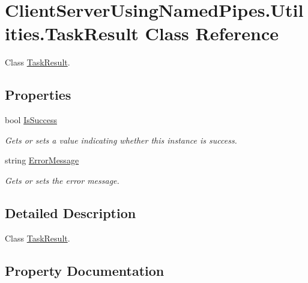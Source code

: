 \hypertarget{class_client_server_using_named_pipes_1_1_utilities_1_1_task_result}{}\section{Client\+Server\+Using\+Named\+Pipes.\+Utilities.\+Task\+Result Class Reference}
\label{class_client_server_using_named_pipes_1_1_utilities_1_1_task_result}


Class \hyperlink{class_client_server_using_named_pipes_1_1_utilities_1_1_task_result}{Task\+Result}.  


\subsection*{Properties}
\begin{DoxyCompactItemize}
\item 
bool \hyperlink{class_client_server_using_named_pipes_1_1_utilities_1_1_task_result_a3c996932ff1f7e1754af3f0b34f6669e}{Is\+Success}
\begin{DoxyCompactList}\small\item\em Gets or sets a value indicating whether this instance is success. \end{DoxyCompactList}\item 
string \hyperlink{class_client_server_using_named_pipes_1_1_utilities_1_1_task_result_a9fe5fdb20d17f6064ac18f8e68c268a3}{Error\+Message}
\begin{DoxyCompactList}\small\item\em Gets or sets the error message. \end{DoxyCompactList}\end{DoxyCompactItemize}


\subsection{Detailed Description}
Class \hyperlink{class_client_server_using_named_pipes_1_1_utilities_1_1_task_result}{Task\+Result}. 



\subsection{Property Documentation}
\mbox{\label{class_client_server_using_named_pipes_1_1_utilities_1_1_task_result_a9fe5fdb20d17f6064ac18f8e68c268a3}} 
